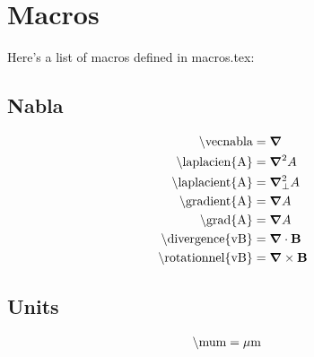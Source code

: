 \section{Macros}

Here's a list of macros defined in macros.tex:

\subsection{Nabla}
\begin{subequations}
\begin{align}
\textrm{\textbackslash vecnabla}            & = \bm{\nabla}           \label{eqn:vnabla}      \\
\textrm{\textbackslash laplacien\{A\}}      & = \bm{\nabla}^2 A       \label{eqn:laplacien}   \\
\textrm{\textbackslash laplacient\{A\}}     & = \bm{\nabla}_{\bot}^{2} A      \label{eqn:laplacient}  \\
\textrm{\textbackslash gradient\{A\}}       & = \bm{\nabla} A        \label{eqn:gradient}    \\
\textrm{\textbackslash grad\{A\}}           & = \bm{\nabla} A            \label{eqn:grad}        \\
\textrm{\textbackslash divergence\{vB\}}    & = \bm{\nabla} \cdot \textbf{B}    \label{eqn:divergence}  \\
\textrm{\textbackslash rotationnel\{vB\}}   & = \bm{\nabla} \times \textbf{B}   \label{eqn:rotationnel}
\end{align}
\end{subequations}

\subsection{Units}
\begin{align}
\textrm{\textbackslash mum}                 & = \mu \textrm{m}                \label{eqn:mum}
\end{align}

